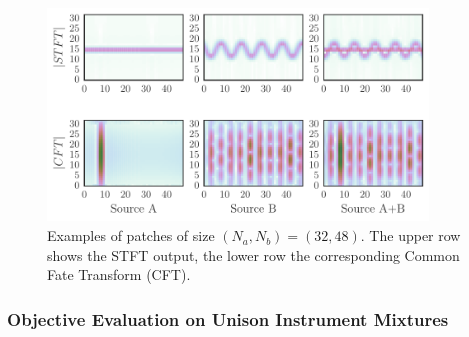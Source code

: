 \begin{figure}[!h]
\centering
    \includegraphics[width=0.9\textwidth]{Chapters/06_Separation_Unknown/figures/gridplot.pdf}
\caption{Examples of patches of size $(N_a, N_b) = (32, 48)$. The upper row shows the \acs{STFT} output, the lower row the corresponding Common Fate Transform (CFT).}
\label{fig:gridplot}
\end{figure}

\subsubsection{Objective Evaluation on Unison Instrument Mixtures}

